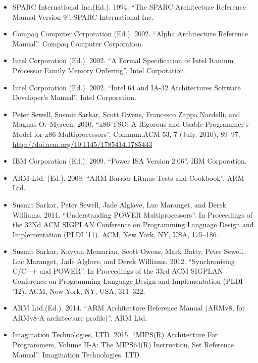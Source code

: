 \begin{itemize}
\item	SPARC International Inc.\@ (Ed.). 1994. ``The SPARC Architecture
	Reference Manual Version 9''. SPARC International Inc.

\item	Compaq Computer Corporation (Ed.). 2002. ``Alpha Architecture
	Reference Manual''.  Compaq Computer Corporation.

\item	Intel Corporation (Ed.). 2002. ``A Formal Specification of Intel
	Itanium Processor Family Memory Ordering''. Intel Corporation.

\item	Intel Corporation (Ed.). 2002. ``Intel 64 and IA-32 Architectures
	Software Developer’s Manual''. Intel Corporation.

\item	Peter Sewell, Susmit Sarkar, Scott Owens, Francesco Zappa Nardelli,
	and Magnus O.~Myreen. 2010. ``x86-TSO: A Rigorous and Usable
	Programmer's Model for x86 Multiprocessors''. Commun.\@ ACM 53, 7
	(July, 2010), 89--97. \url{http://doi.acm.org/10.1145/1785414.1785443}

\item	IBM Corporation (Ed.). 2009. ``Power ISA Version 2.06''. IBM
	Corporation.

\item	ARM Ltd. (Ed.). 2009. ``ARM Barrier Litmus Tests and Cookbook''.
	ARM Ltd.

\item	Susmit Sarkar, Peter Sewell, Jade Alglave, Luc Maranget, and
	Derek Williams.  2011. ``Understanding POWER Multiprocessors''. In
	Proceedings of the 32Nd ACM SIGPLAN Conference on Programming
	Language Design and Implementation (PLDI ’11). ACM, New York,
	NY, USA, 175--186.

\item	Susmit Sarkar, Kayvan Memarian, Scott Owens, Mark Batty,
	Peter Sewell, Luc Maranget, Jade Alglave, and Derek Williams.
	2012. ``Synchronising C/C++ and POWER''. In Proceedings of the 33rd
	ACM SIGPLAN Conference on Programming Language Design and
	Implementation (PLDI '12). ACM, New York, NY, USA, 311--322.

\item	ARM Ltd.\@ (Ed.). 2014. ``ARM Architecture Reference Manual (ARMv8,
	for ARMv8-A architecture profile)''. ARM Ltd.

\item	Imagination Technologies, LTD. 2015. ``MIPS(R) Architecture
	For Programmers, Volume II-A: The MIPS64(R) Instruction,
	Set Reference Manual''. Imagination Technologies, LTD.


\end{itemize}
